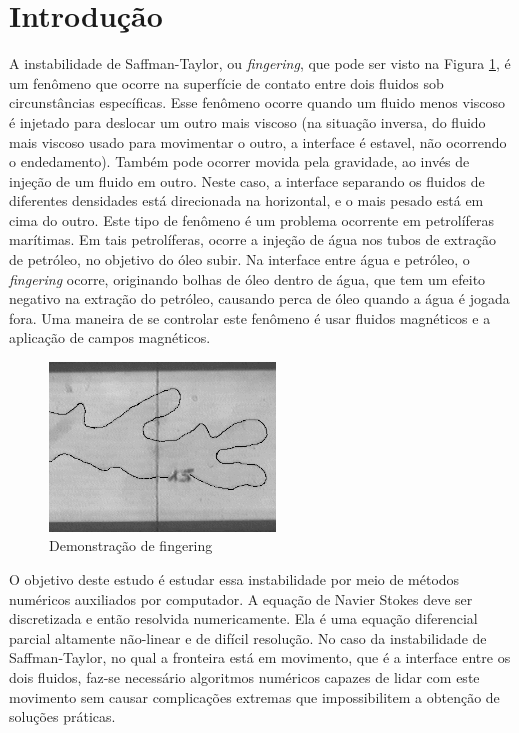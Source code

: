 \documentclass[journal]{IEEEtran}
\begin{document}
\section{Introdução}
A instabilidade de Saffman-Taylor, ou \textit{fingering}\cite{fingering}, que pode ser visto na Figura \ref{finger}, é um fenômeno que ocorre na superfície de contato entre dois fluidos sob circunstâncias específicas. Esse fenômeno ocorre quando um fluido menos viscoso é injetado para deslocar um outro mais viscoso (na situação inversa, do fluido mais viscoso usado para movimentar o outro, a interface é estavel, não ocorrendo o endedamento). Também pode ocorrer movida pela gravidade, ao invés de injeção de um fluido em outro. Neste caso, a interface separando os fluidos de diferentes densidades está direcionada na horizontal, e o mais pesado está em cima do outro. Este tipo de fenômeno é um problema ocorrente em petrolíferas marítimas. Em tais petrolíferas, ocorre a injeção de água nos tubos de extração de petróleo, no objetivo do óleo subir. Na interface entre água e petróleo, o \textit{fingering} ocorre, originando bolhas de óleo dentro de água, que tem um efeito negativo na extração do petróleo, causando perca de óleo quando a água é jogada fora. Uma maneira de se controlar este fenômeno é usar fluidos magnéticos e a aplicação de campos magnéticos\cite{magnetic_fluids}.
\begin{figure}[!ht]
\centering
\includegraphics[width=6cm]{figures/fingergel.png}
\caption{Demonstração de fingering\label{finger}}
\end{figure}

O objetivo deste estudo é estudar essa instabilidade por meio de métodos numéricos auxiliados por computador. A equação de Navier Stokes deve ser discretizada e então resolvida numericamente. Ela é uma equação diferencial parcial altamente não-linear e de difícil resolução. No caso da instabilidade de Saffman-Taylor, no qual a fronteira está em movimento, que é a interface entre os dois fluidos, faz-se necessário algoritmos numéricos capazes de lidar com este movimento sem causar complicações extremas que impossibilitem a obtenção de soluções práticas\cite{immersed_boundary_methods}. 
\end{document}
